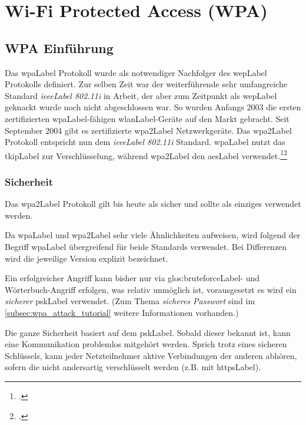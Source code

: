 \chapter{Wi-Fi Protected Access (WPA)}
\label{ch:wpa}

\section{WPA Einführung}
Das \gls{wpaLabel} Protokoll wurde als notwendiger Nachfolger des \gls{wepLabel} Protokolls definiert.
Zur selben Zeit war der weiterführende sehr umfangreiche Standard \textit{\gls{ieeeLabel} 802.11i} in Arbeit, der aber zum Zeitpunkt als \gls{wepLabel} geknackt wurde noch nicht abgeschlossen war.
So wurden Anfangs 2003 die ersten zertifizierten \gls{wpaLabel}-fähigen \gls{wlanLabel}-Geräte auf den Markt gebracht.
Seit September 2004 gibt es zertifizierte \gls{wpa2Label} Netzwerkgeräte. Das \gls{wpa2Label} Protokoll entspricht nun dem \textit{\gls{ieeeLabel} 802.11i} Standard.
\gls{wpaLabel} nutzt das \gls{tkipLabel} zur Verschlüsselung, während \gls{wpa2Label} den \gls{aesLabel} verwendet.\footcite{Wi-Fi_Protected_Access__Wikipedia_2015-04-10}\footcite{WPA2__Wikipedia_2015-04-10}

\subsection{Sicherheit}
Das \gls{wpa2Label} Protokoll gilt bis heute als sicher und sollte als einziges verwendet werden.

Da \gls{wpaLabel} und \gls{wpa2Label} sehr viele Ähnlichkeiten aufweisen, wird folgend der Begriff \gls{wpaLabel} übergreifend für beide Standards verwendet. Bei Differenzen wird die jeweilige Version explizit bezeichnet.

Ein erfolgreicher Angriff kann bisher nur via \gls{glos:bruteforceLabel}- und Wörterbuch-Angriff erfolgen, was relativ unmöglich ist, vorausgesetzt es wird ein \textit{sicherer} \gls{pskLabel} verwendet. (Zum Thema \textit{sicheres Passwort} sind im \cref{subsec:wpa_attack_tutorial} weitere Informationen vorhanden.)


Die ganze Sicherheit basiert auf dem \gls{pskLabel}.
Sobald dieser bekannt ist, kann eine Kommunikation problemlos mitgehört werden.
Sprich trotz eines sicheren Schlüssels, kann jeder Netzteilnehmer aktive Verbindungen der anderen abhören, sofern die nicht andersartig verschlüsselt werden (z.B. mit \gls{httpsLabel}).


